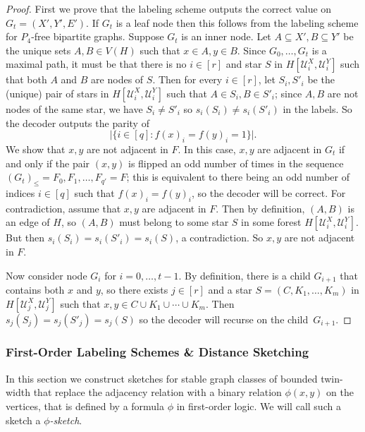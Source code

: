 \documentclass{theoretics}
\newcommand{\cU}{\ensuremath{\mathcal{U}}}
\begin{document}
\begin{proof}
First we prove that the labeling scheme outputs the correct value on $G_t = (X',Y',E')$. If $G_t$ is
a leaf node then this follows from the labeling scheme for $P_4$-free bipartite graphs.  Suppose
$G_t$ is an inner node. Let $A \subseteq X', B \subseteq Y'$ be the unique sets $A, B \in V(H)$ such
that $x \in A, y \in B$. Since $G_0, \dotsc, G_t$ is a maximal path, it must be that there is no $i
\in [r]$ and star $S$ in $H[\cU^X_i,\cU^Y_i]$ such that both $A$ and $B$ are nodes of $S$. Then for every $i \in [r]$, let
$S_i,S'_i$ be the (unique) pair of stars in $H[\cU^X_i,\cU^Y_i]$ such that $A \in S_i, B \in S'_i$; since
$A,B$ are not nodes of the same star, we have $S_i \neq S'_i$ so $s_i(S_i) \neq s_i(S'_i)$ in the
labels. So the decoder outputs the parity of
\[
  \bigl|\bigl\{ i \in [q] : f(x)_i = f(y)_i = 1\bigr\}\bigr|.
\]
We show that $x,y$ are not adjacent in $F$. In this case, $x,y$ are adjacent in $G_t$ if and
only if the pair $(x,y)$ is flipped an odd number of times in the sequence $(G_t)_\leq = F_0, F_1,
\dotsc, F_{q'} = F$; this is equivalent to there being an odd number of indices $i \in [q]$ such
that $f(x)_i = f(y)_i$, so the decoder will be correct.
For contradiction, assume that $x,y$ are adjacent in $F$. Then by definition, $(A,B)$ is an edge of
$H$, so $(A,B)$ must belong to some star $S$ in some forest $H[\cU^X_i,\cU^Y_i]$. But then $s_i(S_i) = s_i(S'_i)
= s_i(S)$, a contradiction. So $x,y$ are not adjacent in $F$.

Now consider node $G_i$ for $i = 0, \dotsc, t-1$. By definition, there is a child $G_{i+1}$ that
contains both $x$ and $y$, so there exists $j \in [r]$ and a star $S = (C, K_1, \dotsc, K_m)$
in $H[\cU^X_j,\cU^Y_j]$ such that $x,y \in C \cup K_1 \cup \dotsm \cup K_m$. Then $s_j(S_j)=s_j(S'_j)=s_j(S)$ so
the decoder will recurse on the child~$G_{i+1}$. 
\end{proof}

\subsubsection{First-Order Labeling Schemes \& Distance Sketching}
\label{section:distance sketching}

In this section we construct sketches for stable graph classes of bounded twin-width that replace
the adjacency relation with a binary relation $\phi(x,y)$ on the vertices, that is defined by a
formula $\phi$ in first-order logic. We will call such a sketch a \emph{$\phi$-sketch}.
\end{document}
